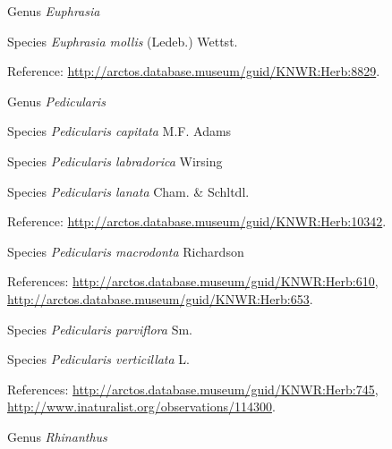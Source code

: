 \documentclass[9pt, article]{memoir}
\begin{document}
\begin{multicols}{2}
\vspace{6pt}\noindent\hspace{30pt}Genus \textit{Euphrasia}


\vspace{6pt}\noindent\hspace{36pt}Species \textit{Euphrasia mollis} (Ledeb.) Wettst.


\vspace{6pt}Reference: 
\url{http://arctos.database.museum/guid/KNWR:Herb:8829}.

\vspace{6pt}\noindent\hspace{30pt}Genus \textit{Pedicularis}


\vspace{6pt}\noindent\hspace{36pt}Species \textit{Pedicularis capitata} M.F. Adams


\vspace{6pt}\noindent\hspace{36pt}Species \textit{Pedicularis labradorica} Wirsing


\vspace{6pt}\noindent\hspace{36pt}Species \textit{Pedicularis lanata} Cham. \& Schltdl.


\vspace{6pt}Reference: 
\url{http://arctos.database.museum/guid/KNWR:Herb:10342}.

\vspace{6pt}\noindent\hspace{36pt}Species \textit{Pedicularis macrodonta} Richardson


\vspace{6pt}References: 
\url{http://arctos.database.museum/guid/KNWR:Herb:610}, 
\url{http://arctos.database.museum/guid/KNWR:Herb:653}.

\vspace{6pt}\noindent\hspace{36pt}Species \textit{Pedicularis parviflora} Sm.


\vspace{6pt}\noindent\hspace{36pt}Species \textit{Pedicularis verticillata} L.


\vspace{6pt}References: 
\url{http://arctos.database.museum/guid/KNWR:Herb:745}, 
\url{http://www.inaturalist.org/observations/114300}.

\vspace{6pt}\noindent\hspace{30pt}Genus \textit{Rhinanthus}



\end{multicols}
\end{document}
